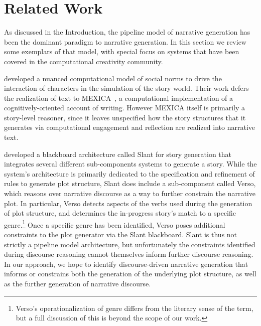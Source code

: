 \section{Related Work}

As discussed in the Introduction, the pipeline model of narrative generation 
has been the dominant paradigm to narrative generation. In this section we
review some exemplars of that model, with special focus on systems that have
been covered in the computational creativity community.

 developed a nuanced computational model of social
norms to drive the interaction of characters in the simulation of the story
world. Their work defers the realization of text to
MEXICA~\cite{perez2001mexica}, a computational implementation of a
cognitively-oriented account of writing. However MEXICA itself is primarily a
story-level reasoner, since it leaves unspecified how the story structures that
it generates via computational engagement and reflection are realized into
narrative text.


 developed a blackboard architecture called Slant for
story generation that integrates several different sub-components systems to
generate a story. While the system's architecture is primarily dedicated to the
specification and refinement of rules to generate plot structure, Slant does
include a sub-component called Verso, which reasons over narrative discourse as
a way to further constrain the narrative plot. In particular, Verso detects
aspects of the verbs used during the generation of plot structure, and
determines the in-progress story's match to a specific genre.\footnote{Verso's
operationalization of genre differs from the literary sense of the term, but a
full discussion of this is beyond the scope of our work.} Once a specific genre
has been identified, Verso poses additional constraints to the plot generator
via the Slant blackboard. Slant is thus not strictly a pipeline model
architecture, but unfortunately the constraints identified during discourse
reasoning cannot themselves inform further discourse reasoning. In our approach,
we hope to identify discourse-driven narrative generation that informs or
constrains both the generation of the underlying plot structure, as well as the
further generation of narrative discourse.


